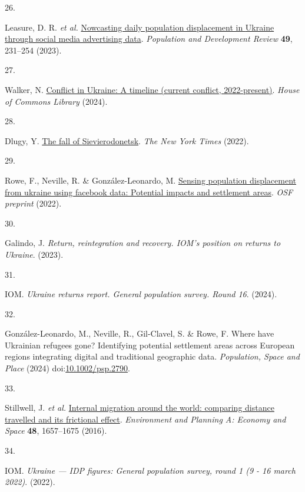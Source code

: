 \documentclass[
  11pt,
]{article}
\newlength{\cslhangindent}
\newlength{\csllabelwidth}
\newenvironment{CSLReferences}[2] %
 {\begin{list}{}{%
  \setlength{\itemindent}{0pt}
  \setlength{\leftmargin}{0pt}
  \setlength{\parsep}{0pt}
  \ifodd #1
   \setlength{\leftmargin}{\cslhangindent}
   \setlength{\itemindent}{-1\cslhangindent}
  \fi
  \setlength{\itemsep}{#2\baselineskip}}}
 {\end{list}}
\newcommand{\CSLLeftMargin}[1]{\parbox[t]{\csllabelwidth}{\strut#1\strut}}
\newcommand{\CSLRightInline}[1]{\parbox[t]{\linewidth - \csllabelwidth}{\strut#1\strut}}
\begin{document}
\begin{CSLReferences}{0}{0}
\CSLLeftMargin{26. }%
\CSLRightInline{Leasure, D. R. \emph{et al.}
\href{https://doi.org/10.1111/padr.12558}{Nowcasting daily population
displacement in {Ukraine} through social media advertising data}.
\emph{Population and Development Review} \textbf{49}, 231--254 (2023).}

\CSLLeftMargin{27. }%
\CSLRightInline{Walker, N.
\href{https://commonslibrary.parliament.uk/research-briefings/cbp-9847/}{Conflict
in {Ukraine: A} timeline (current conflict, 2022-present)}. \emph{{House
of Commons Library}} (2024).}

\CSLLeftMargin{28. }%
\CSLRightInline{Dlugy, Y.
\href{https://www.nytimes.com/2022/06/24/briefing/russia-ukraine-war-sievierodonetsk-romania.html}{The
fall of {Sievierodonetsk}}. \emph{{The New York Times}} (2022).}

\CSLLeftMargin{29. }%
\CSLRightInline{Rowe, F., Neville, R. \& González-Leonardo, M.
\href{http://dx.doi.org/10.31219/osf.io/7n6wm}{Sensing population
displacement from ukraine using facebook data: Potential impacts and
settlement areas}. \emph{OSF preprint} (2022).}

\CSLLeftMargin{30. }%
\CSLRightInline{Galindo, J. \emph{{Return, reintegration and recovery.
IOM's position on returns to Ukraine}}. (2023).}

\CSLLeftMargin{31. }%
\CSLRightInline{IOM. \emph{{Ukraine returns report. General population
survey. Round 16}}. (2024).}

\CSLLeftMargin{32. }%
\CSLRightInline{González-Leonardo, M., Neville, R., Gil-Clavel, S. \&
Rowe, F. Where have Ukrainian refugees gone? Identifying potential
settlement areas across European regions integrating digital and
traditional geographic data. \emph{Population, Space and Place} (2024)
doi:\href{https://doi.org/10.1002/psp.2790}{10.1002/psp.2790}.}

\CSLLeftMargin{33. }%
\CSLRightInline{Stillwell, J. \emph{et al.}
\href{https://doi.org/10.1177/0308518x16643963}{Internal migration
around the world: comparing distance travelled and its frictional
effect}. \emph{Environment and Planning A: Economy and Space}
\textbf{48}, 1657--1675 (2016).}

\CSLLeftMargin{34. }%
\CSLRightInline{IOM. \emph{Ukraine --- IDP figures: General population
survey, round 1 (9 - 16 march 2022)}. (2022).}


\end{CSLReferences}
\end{document}
